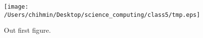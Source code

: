 \documentclass{article}
\begin{document}
  \begin{figure}[thb]
    \centering\texttt{[image: /Users/chihmin/Desktop/science\_computing/class5/tmp.eps]}
    \caption{Out first figure.}\label{fig:test}
  \end{figure}
\end{document}
